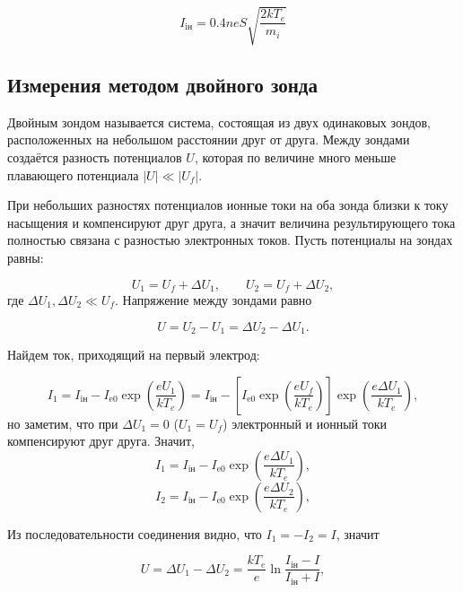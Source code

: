 \documentclass[a4paper]{article}
\begin{document}
\begin{equation}
    I_\text{iн} = 0.4neS \sqrt{\frac{2kT_e}{m_i}}
\end{equation}

\subsection{Измерения методом двойного зонда}
Двойным зондом называется система, состоящая из двух одинаковых зондов,
расположенных на небольшом расстоянии друг от друга.
Между зондами создаётся разность потенциалов $U$, которая по величине
много меньше плавающего потенциала $|U| \ll |U_f|$.

При небольших разностях потенциалов ионные
токи на оба зонда близки к току насыщения и компенсируют друг друга, а значит величина
результирующего тока полностью связана с разностью электронных токов. Пусть потенциалы на зондах равны:

\begin{equation}
    U_1 = U_f + \Delta U_1, \qquad U_2 = U_f + \Delta U_2,
\end{equation}
где $\Delta U_1, \Delta U_2 \ll U_f$. Напряжение между зондами равно

\begin{equation}
    U = U_2 - U_1 = \Delta U_2 - \Delta U_1.
\end{equation}

Найдем ток, приходящий на первый электрод:

\begin{equation}
    I_1 = I_\text{iн} - I_\text{e0} \exp(\frac{eU_1}{kT_e}) = I_\text{iн} - \left[ I_\text{e0} \exp(\frac{eU_f}{kT_e}) \right] \exp(\frac{e \Delta U_1}{kT_e}),
\end{equation}
но заметим, что при $\Delta U_1 = 0$ ($U_1 = U_f$) электронный и ионный токи компенсируют друг друга.
Значит, 
\begin{equation}
    I_1 = I_\text{iн} - I_\text{e0} \exp(\frac{e \Delta U_1}{kT_e}),
\end{equation}
\begin{equation}
    I_2 = I_\text{iн} - I_\text{e0} \exp(\frac{e \Delta U_2}{kT_e}),
\end{equation}

Из последовательности соединения видно, что $I_1 = -I_2 = I$, значит

\begin{equation}
    U = \Delta U_1 - \Delta U_2 = \frac{kT_e}{e} \ln \frac{I_\text{iн} - I}{I_\text{iн} + I},
\end{equation}
\end{document}
